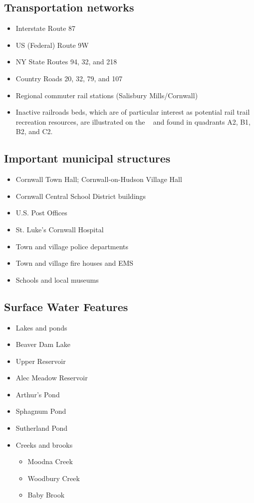 \subsection*{Transportation networks}
\begin{itemize}
    \item Interstate Route 87 
    \item US (Federal) Route 9W
    \item NY State Routes 94, 32, and 218
    \item Country Roads 20, 32, 79, and 107
    \item Regional commuter rail stations (Salisbury Mills/Cornwall)
    \item Inactive railroads beds, which are of particular interest as 
    potential rail trail recreation resources, are illustrated on the ~ 
    and found in quadrants A2, B1, B2, and C2.
\end{itemize}

\subsection*{Important municipal structures}
\begin{itemize}
    \item Cornwall Town Hall; Cornwall-on-Hudson Village Hall
    \item Cornwall Central School District buildings
    \item U.S. Post Offices
    \item St. Luke’s Cornwall Hospital
    \item Town and village police departments
    \item Town and village fire houses and EMS
    \item Schools and local museums 
\end{itemize}

\subsection*{Surface Water Features}
\begin{itemize}
    \item Lakes and ponds
    \item Beaver Dam Lake
    \item Upper Reservoir
    \item Alec Meadow Reservoir
    \item Arthur’s Pond
    \item Sphagnum Pond
    \item Sutherland Pond
    \item Creeks and brooks
    \begin{itemize}
        \item Moodna Creek
        \item Woodbury Creek
        \item Baby Brook
    \end{itemize}
\end{itemize}

